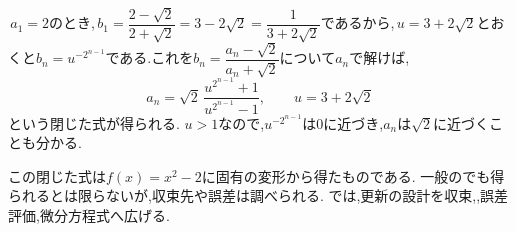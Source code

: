 \,$a_1=2$のとき,\,$b_1=\dfrac{2-\sqrt2}{2+\sqrt2}=3-2\sqrt2=\dfrac1{3+2\sqrt2}$であるから,\,$u=3+2\sqrt2$とおくと$b_n=u^{-2^{n-1}}$である.これを$b_n=\dfrac{a_n-\sqrt2}{a_n+\sqrt2}$について$a_n$で解けば,
\[
  a_n=\sqrt{2}\,\frac{u^{2^{n-1}}+1}{u^{2^{n-1}}-1},\qquad u=3+2\sqrt2
\]
という閉じた式が得られる.
$u>1$なので,$u^{-2^{n-1}}$は$0$に近づき,$a_n$は$\sqrt2$に近づくことも分かる.

この閉じた式は$f(x)=x^2-2$に固有の変形から得たものである.
一般のでも得られるとは限らないが,収束先や誤差は調べられる.
では,更新の設計を収束,,誤差評価,微分方程式へ広げる.
